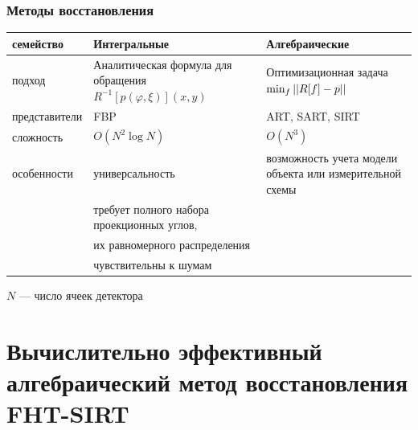 \documentclass[12pt]{beamer}
\begin{document}
\begingroup
\small
\begin{frame}
\frametitle{Методы восстановления}
\begin{tabular}{p{} | p{} | p{}}
\hspace{-1cm} семейство & Интегральные & Алгебраические \\ \hline
\hspace{-1cm} подход & Аналитическая формула для обращения $R^{-1}[p(\varphi, \xi)](x,y)$ & Оптимизационная задача $\min_{f} \left|\left| R[f] - p \right|\right|$\\ \hline
\hspace{-1cm} представители & FBP & ART, SART, SIRT \\ \hline
\hspace{-1cm} сложность & $O(N^2 \log N)$ & $O(N^3)$ \\ \hline
\hspace{-1cm} особенности & универсальность & возможность учета \hspace{1cm} модели объекта или измерительной схемы \\
                          & требует полного набора проекционных углов, & \\ 
                          & их равномерного распределения & \\
                          & чувствительны к шумам & \\
\end{tabular}

$N$ --- число ячеек детектора
\end{frame}
\endgroup


\section{Вычислительно эффективный алгебраический метод восстановления FHT-SIRT}
\end{document}
